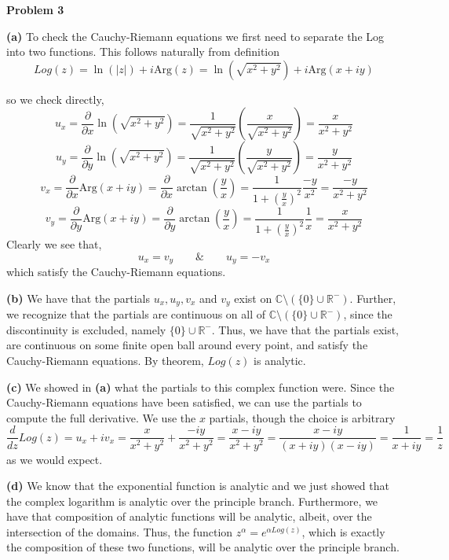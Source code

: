 \documentclass[10pt]{article}
\newcommand{\R}{\mathbb{R}}
\newcommand{\C}{\mathbb{C}}
\newcommand{\Arg}{\text{Arg}}
\begin{document}
\textbf{Problem 3}

\textbf{(a)}
To check the Cauchy-Riemann equations we first need to separate the Log into two functions. This follows naturally from definition
$$Log(z) = \ln(|z|) + i\Arg(z) = \ln(\sqrt{x^{2} + y^{2}}) + i\Arg(x+iy)$$

\newpage
so we check directly,
$$u_{x} = \frac{\partial}{\partial x} \ln(\sqrt{x^{2} + y^{2}}) = \frac{1}{\sqrt{x^{2} + y^{2}}}\left(\frac{x}{\sqrt{x^{2} + y^{2}}}\right) = \frac{x}{x^{2} + y^{2}}$$
$$u_{y} = \frac{\partial}{\partial y} \ln(\sqrt{x^{2} + y^{2}}) = \frac{1}{\sqrt{x^{2} + y^{2}}}\left(\frac{y}{\sqrt{x^{2} + y^{2}}}\right) = \frac{y}{x^{2} + y^{2}}$$
$$v_{x} = \frac{\partial}{\partial x}\Arg(x + iy) = \frac{\partial}{\partial x}\arctan\left(\frac{y}{x}\right) = \frac{1}{1 + \left(\frac{y}{x}\right)^{2}}\frac{-y}{x^{2}} = \frac{-y}{x^{2} + y^{2}}$$
$$v_{y} = \frac{\partial}{\partial y}\Arg(x + iy) = \frac{\partial}{\partial y}\arctan\left(\frac{y}{x}\right) = \frac{1}{1 + \left(\frac{y}{x}\right)^{2}}\frac{1}{x} = \frac{x}{x^{2} + y^{2}}$$
Clearly we see that,
$$u_{x} = v_{y} \hspace{2em} \& \hspace{2em} u_{y} = -v_{x}$$
which satisfy the Cauchy-Riemann equations.

\textbf{(b)}
We have that the partials $u_{x},u_{y},v_{x}$ and $v_{y}$ exist on $\C\setminus (\{0\} \cup \R^{-})$. Further, we recognize that the partials are continuous on all of $\C\setminus (\{0\}\cup \R^{-})$, since the discontinuity is excluded, namely $\{0\}\cup \R^{-}$. Thus, we have that the partials exist, are continuous on some finite open ball around every point, and satisfy the Cauchy-Riemann equations. By theorem, $Log(z)$ is analytic.

\textbf{(c)}
We showed in \textbf{(a)} what the partials to this complex function were. Since the Cauchy-Riemann equations have been satisfied, we can use the partials to compute the full derivative. We use the $x$ partials, though the choice is arbitrary
$$\frac{d}{dz}Log(z) = u_{x} + iv_{x} =  \frac{x}{x^{2} + y^{2}} + \frac{-iy}{x^{2} + y^{2}} = \frac{x -iy}{x^{2} + y^{2}} = \frac{x-iy}{(x+iy)(x-iy)} = \frac{1}{x+iy} = \frac{1}{z}$$
as we would expect.

\textbf{(d)}
We know that the exponential function is analytic and we just showed that the complex logarithm is analytic over the principle branch. Furthermore, we have that composition of analytic functions will be analytic, albeit, over the intersection of the domains. Thus, the function $z^{\alpha} = e^{\alpha Log(z)}$, which is exactly the composition of these two functions, will be analytic over the principle branch.
\end{document}
